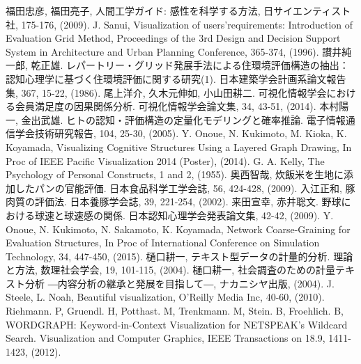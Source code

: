 \documentclass[syuuron]{kuee}
\begin{document}


\begin{thebibliography}{数字}
	 福田忠彦, 福田亮子, 人間工学ガイド: 感性を科学する方法, 日サイエンティスト社, 175-176, (2009).
	 J. Sanui, Visualization of users’requirements: Introduction of Evaluation Grid Method, Proceedings of the 3rd Design and Decision Support System in Architecture and Urban Planning Conference, 365-374, (1996).
	 讃井純一郎, 乾正雄. レパートリー・グリッド発展手法による住環境評価構造の抽出：認知心理学に基づく住環境評価に関する研究(1). 日本建築学会計画系論文報告集, 367, 15-22, (1986).
	 尾上洋介, 久木元伸如, 小山田耕二. 可視化情報学会における会員満足度の因果関係分析. 可視化情報学会論文集, 34, 43-51, (2014).
	 本村陽一, 金出武雄. ヒトの認知・評価構造の定量化モデリングと確率推論. 電子情報通信学会技術研究報告, 104, 25-30, (2005).
	 Y. Onoue, N. Kukimoto, M. Kioka, K. Koyamada, Visualizing Cognitive Structures Using a Layered Graph Drawing, In Proc of IEEE Pacific Visualization 2014 (Poster), (2014).
	 G. A. Kelly, The Psychology of Personal Constructs, 1 and 2, (1955).
	 奥西智哉, 炊飯米を生地に添加したパンの官能評価. 日本食品科学工学会誌, 56, 424-428, (2009).
	 入江正和, 豚肉質の評価法. 日本養豚学会誌, 39, 221-254, (2002).
	 来田宣幸, 赤井聡文. 野球における球速と球速感の関係. 日本認知心理学会発表論文集, 42-42, (2009).
	 Y. Onoue, N. Kukimoto, N. Sakamoto, K. Koyamada, Network Coarse-Graining for Evaluation Structures, In Proc of International Conference on Simulation Technology, 34, 447-450, (2015). 
	 樋口耕一, テキスト型データの計量的分析. 理論と方法, 数理社会学会, 19, 101-115, (2004).
	 樋口耕一, 社会調査のための計量テキスト分析 ―内容分析の継承と発展を目指して―, ナカニシヤ出版, (2004).
	 J. Steele, L. Noah, Beautiful visualization, O'Reilly Media Inc, 40-60, (2010).
	 Riehmann. P, Gruendl. H, Potthast. M, Trenkmann. M, Stein. B, Froehlich. B, WORDGRAPH: Keyword-in-Context Visualization for NETSPEAK's Wildcard Search. Visualization and Computer Graphics, IEEE Transactions on 18.9, 1411-1423, (2012).


\end{thebibliography}
\end{document}

